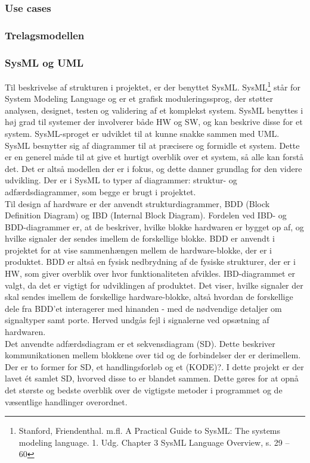 \subsubsection{Use cases}
\subsubsection{Trelagsmodellen}
\subsubsection{SysML og UML}

Til beskrivelse af strukturen i projektet, er der benyttet SysML. 
SysML\footnote{Stanford, Friendenthal. m.fl. A Practical Guide to SysML: The systems modeling language. 1. Udg. Chapter 3 SysML Language Overview, s. 29 – 60} står for System Modeling Language og er et grafisk moduleringssprog, der støtter analysen, designet, testen og validering af et komplekst system. SysML benyttes i høj grad til systemer der involverer både HW og SW, og kan beskrive disse for et system. SysML-sproget er udviklet til at kunne snakke sammen med UML. 
SysML besnytter sig af diagrammer til at præcisere og formidle et system. Dette er en generel måde til at give et hurtigt overblik over et system, så alle kan forstå det. Det er altså modellen der er i fokus, og dette danner grundlag for den videre udvikling. Der er i SysML to typer af diagrammer: struktur- og adfærdsdiagrammer, som begge er brugt i projektet.\\
\newline
Til design af hardware er der anvendt strukturdiagrammer, BDD (Block Definition Diagram) og IBD (Internal Block Diagram). Fordelen ved IBD- og BDD-diagrammer er, at de beskriver, hvilke blokke hardwaren er bygget op af, og hvilke signaler der sendes imellem de forskellige blokke. BDD er anvendt i projektet for at vise sammenhængen mellem de hardware-blokke, der er i produktet. BDD er altså en fysisk nedbrydning af de fysiske strukturer, der er i HW, som giver overblik over hvor funktionaliteten afvikles. IBD-diagrammet er valgt, da det er vigtigt for udviklingen af produktet. Det viser, hvilke signaler der skal sendes imellem de forskellige hardware-blokke, altså hvordan de forskellige dele fra BDD'et interagerer med hinanden - med de nødvendige detaljer om signaltyper samt porte. Herved undgås fejl i signalerne ved opsætning af hardwaren.\\
\newline
Det anvendte adfærdsdiagram er et sekvensdiagram (SD). Dette beskriver kommunikationen mellem blokkene over tid og de forbindelser der er derimellem. Der er to former for SD, et handlingsforløb og et (KODE)?. I dette projekt er der lavet ét samlet SD, hvorved disse to er blandet sammen. Dette gøres for at opnå det største og bedste overblik over de vigtigste metoder i programmet og de væsentlige handlinger overordnet. \\
